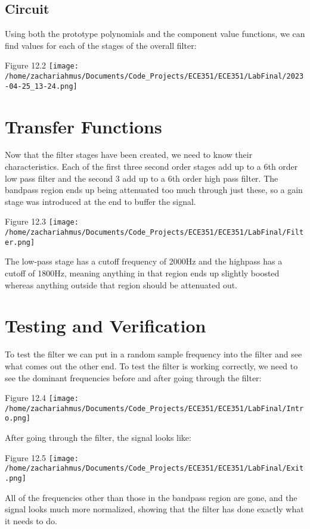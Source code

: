 \documentclass[12pt,a4paper]{article}
\begin{document}
\subsection*{Circuit}
Using both the prototype polynomials and the component value functions, we can find values for each of the stages of the overall filter: 
\begin{center}
	{Figure 12.2}
	\texttt{[image: /home/zachariahmus/Documents/Code\_Projects/ECE351/ECE351/LabFinal/2023-04-25\_13-24.png]}
\end{center}
\vspace{12pt}

\section*{Transfer Functions}
Now that the filter stages have been created, we need to know their characteristics. Each of the first three second order stages add up to a 6th order low pass filter and the second 3 add up to a 6th order high pass filter. The bandpass region ends up being attenuated too much through just these, so a gain stage was introduced at the end to buffer the signal.
\begin{center}
	{Figure 12.3}
\texttt{[image: /home/zachariahmus/Documents/Code\_Projects/ECE351/ECE351/LabFinal/Filter.png]}
\end{center}
The low-pass stage has a cutoff frequency of 2000Hz and the highpass has a cutoff of 1800Hz, meaning anything in that region ends up slightly boosted whereas anything outside that region should be attenuated out. 
\section*{Testing and Verification}
To test the filter we can put in a random sample frequency into the filter and see what comes out the other end. To test the filter is working correctly, we need to see the dominant frequencies before and after going through the filter: 
\begin{center}
	{Figure 12.4}
\texttt{[image: /home/zachariahmus/Documents/Code\_Projects/ECE351/ECE351/LabFinal/Intro.png]}
\end{center}
After going through the filter, the signal looks like: 
\begin{center}
	{Figure 12.5}
\texttt{[image: /home/zachariahmus/Documents/Code\_Projects/ECE351/ECE351/LabFinal/Exit.png]}

All of the frequencies other than those in the bandpass region are gone, and the signal looks much more normalized, showing that the filter has done exactly what it needs to do. 
\end{center}
\end{document}
